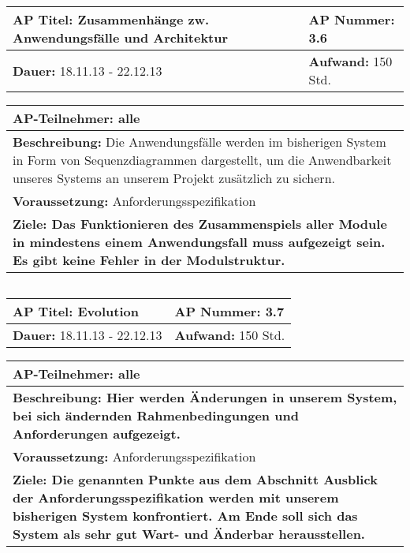 \begin{tabular}{|p{7.43cm}|p{7.43cm}|}
\hline
\textbf{AP Titel: }Zusammenhänge zw. Anwendungsfälle und Architektur & \textbf{AP Nummer: }3.6\\ 
\hline
\textbf{Dauer: }18.11.13 - 22.12.13& \textbf{Aufwand: }150 Std.\\
\hline
\end{tabular}
\begin{tabular}{|p{15.3cm}|}
\hline
\textbf{AP-Teilnehmer: }alle\\
\hline
\textbf{Beschreibung: } Die Anwendungsfälle werden im bisherigen System in Form von Sequenzdiagrammen dargestellt, um die Anwendbarkeit unseres Systems an unserem Projekt
zusätzlich zu sichern.\\
\hline
\textbf{Voraussetzung: }Anforderungsspezifikation\\
\hline 
\textbf{Ziele: Das Funktionieren des Zusammenspiels aller Module in mindestens einem Anwendungsfall muss aufgezeigt sein. Es gibt keine Fehler in der Modulstruktur.}\\
\hline 
\end{tabular}
\begin{verbatim}

\end{verbatim}

\begin{tabular}{|p{7.43cm}|p{7.43cm}|}
\hline
\textbf{AP Titel: }Evolution & \textbf{AP Nummer: }3.7\\ 
\hline
\textbf{Dauer: }18.11.13 - 22.12.13& \textbf{Aufwand: }150 Std.\\
\hline
\end{tabular}
\begin{tabular}{|p{15.3cm}|}
\hline
\textbf{AP-Teilnehmer: }alle\\
\hline
\textbf{Beschreibung: Hier werden Änderungen in unserem System, bei sich ändernden Rahmenbedingungen und Anforderungen aufgezeigt.}\\
\hline
\textbf{Voraussetzung: }Anforderungsspezifikation\\
\hline 
\textbf{Ziele: Die genannten Punkte aus dem Abschnitt Ausblick der Anforderungsspezifikation 
werden mit unserem bisherigen System konfrontiert. Am Ende soll sich das System als sehr gut Wart- und Änderbar herausstellen.}\\
\hline 
\end{tabular}
\begin{verbatim}

\end{verbatim}

